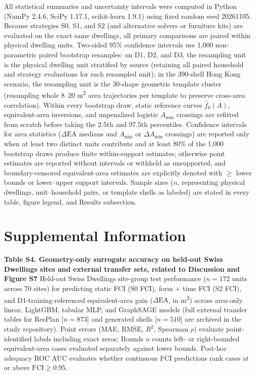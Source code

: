 \documentclass[12pt,letterpaper]{article}
\begin{document}
All statistical summaries and uncertainty intervals were computed in Python (NumPy 2.4.6, SciPy 1.17.1, scikit-learn 1.9.1) using fixed random seed 20261105. Because strategies S0, S1, and S2 (and alternative solvers or furniture kits) are evaluated on the exact same dwellings, all primary comparisons are paired within physical dwelling units. Two-sided 95\% confidence intervals use 1,000 non-parametric paired bootstrap resamples: on D1, D2, and D3, the resampling unit is the physical dwelling unit stratified by source (retaining all paired household and strategy evaluations for each resampled unit); in the 390-shell Hong Kong scenario, the resampling unit is the 30-shape geometric template cluster (resampling whole 8--20 m\textsuperscript{2} area trajectories per template to preserve cross-area correlation). Within every bootstrap draw, static reference curves \(\hat{f}_0(A)\), equivalent-area inversions, and unpenalized logistic \(A_{\min}\) crossings are refitted from scratch before taking the 2.5th and 97.5th percentiles. Confidence intervals for area statistics (\(\Delta\text{EA}\) medians and \(A_{\min}\) or \(\Delta A_{\min}\) crossings) are reported only when at least two distinct units contribute and at least 80\% of the 1,000 bootstrap draws produce finite within-support estimates; otherwise point estimates are reported without intervals or withheld as unsupported, and boundary-censored equivalent-area estimates are explicitly denoted with \ensuremath{\geq} lower bounds or lower--upper support intervals. Sample sizes (\(n\), representing physical dwellings, unit--household pairs, or template shells as labeled) are stated in every table, figure legend, and Results subsection.

\section{Supplemental Information}\label{supplemental-information}

\textbf{Table S4. Geometry-only surrogate accuracy on held-out Swiss Dwellings sites and external transfer sets, related to Discussion and Figure S7} Held-out Swiss Dwellings site-group test performance (\(n = 172\) units across 70 sites) for predicting static FCI (S0 FCI), form + time FCI (S2 FCI), and D1-training-referenced equivalent-area gain (\(\Delta\text{EA}\), in m\textsuperscript{2}) across area-only linear, LightGBM, tabular MLP, and GraphSAGE models (full external transfer tables for ResPlan {[}\(n = 873\){]} and generated shells {[}\(n = 510\){]} are archived in the study repository). Point errors (MAE, RMSE, \(R^2\), Spearman \(\rho\)) evaluate point-identified labels including exact zeros; Bounds \(n\) counts left- or right-bounded equivalent-area cases evaluated separately against lower bounds. Post-hoc adequacy ROC AUC evaluates whether continuous FCI predictions rank cases at or above \(\text{FCI} \ge 0.95\).
\end{document}
